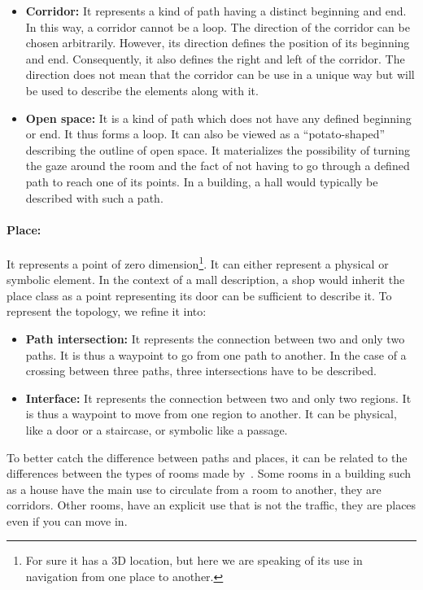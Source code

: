 \begin{itemize}
  \item \textbf{Corridor:} It represents a kind of path having a distinct beginning and end. In this way, a corridor cannot be a loop. The direction of the corridor can be chosen arbitrarily. However, its direction defines the position of its beginning and end. Consequently, it also defines the right and left of the corridor. The direction does not mean that the corridor can be use in a unique way but will be used to describe the elements along with it.
  \item \textbf{Open space:} It is a kind of path which does not have any defined beginning or end. It thus forms a loop. It can also be viewed as a ``potato-shaped'' describing the outline of open space. It materializes the possibility of turning the gaze around the room and the fact of not having to go through a defined path to reach one of its points. In a building, a hall would typically be described with such a path.
\end{itemize}

\paragraph{Place:} It represents a point of zero dimension\footnote{For sure it has a 3D location, but here we are speaking of its use in navigation from one place to another.}. It can either represent a physical or symbolic element. In the context of a mall description, a shop would inherit the place class as a point representing its door can be sufficient to describe it. To represent the topology, we refine it into:
  
\begin{itemize}
  \item \textbf{Path intersection:} It represents the connection between two and only two paths. It is thus a waypoint to go from one path to another. In the case of a crossing between three paths, three intersections have to be described.
  \item \textbf{Interface:} It represents the connection between two and only two regions. It is thus a waypoint to move from one region to another. It can be physical, like a door or a staircase, or symbolic like a passage.
\end{itemize}

To better catch the difference between paths and places, it can be related to the differences between the types of rooms made by~\cite{andresen_2016_wayfinding}. Some rooms in a building such as a house have the main use to circulate from a room to another, they are corridors. Other rooms, have an explicit use that is not the traffic, they are places even if you can move in.

